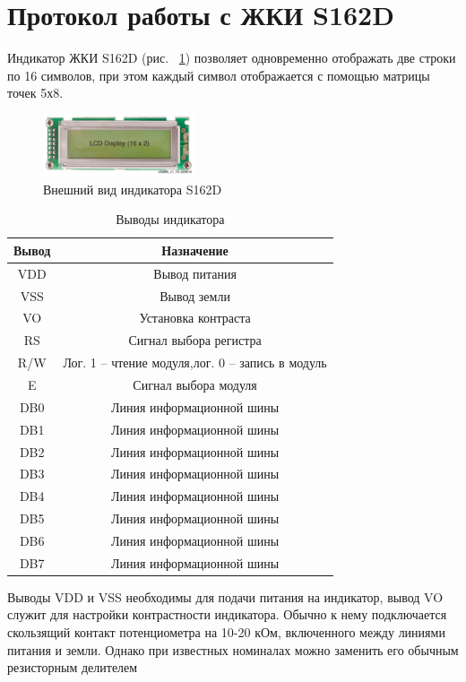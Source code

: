 \documentclass[a4paper,oneside ,10pt]{extreport}
\begin{document}
\section{Протокол работы с ЖКИ S162D}

Индикатор ЖКИ S162D (рис. ~\ref{LCD1602}) позволяет одновременно отображать две строки по 16 символов, при этом каждый символ отображается с помощью матрицы точек 5х8. 

\begin{figure}[!ht]
	\centering
	\includegraphics[width=0.4\textwidth]{image/LCD1602.PNG}
	\caption{Внешний вид индикатора S162D}
	\label{LCD1602}
\end{figure}

\begin{table}[!ht]
	\begin{center}
		\begin{tabular}{c c}
			\hline\hline
			Вывод & Назначение \\
			\hline
			VDD & Вывод питания \\
			VSS & Вывод земли \\
			VO & Установка контраста \\
			RS & Сигнал выбора регистра \\
			R/W & Лог. 1 – чтение модуля,лог. 0 – запись в модуль \\
			E & Сигнал выбора модуля \\
			DB0 & Линия информационной шины \\
			DB1 & Линия информационной шины \\
			DB2 & Линия информационной шины \\
			DB3 & Линия информационной шины \\
			DB4 & Линия информационной шины \\
			DB5 & Линия информационной шины \\
			DB6 & Линия информационной шины \\
			DB7 & Линия информационной шины \\
			\hline
		\end{tabular}
		\caption{Выводы индикатора}
		\label{LCD_PIN}
	\end{center}
\end{table}

Выводы VDD и VSS необходимы для подачи питания на индикатор, 
вывод VO служит для настройки контрастности индикатора. Обычно к 
нему подключается скользящий контакт потенциометра на 10-20 
кОм, включенного между линиями питания и земли. Однако при 
известных номиналах можно заменить его обычным резисторным 
делителем
\end{document}
